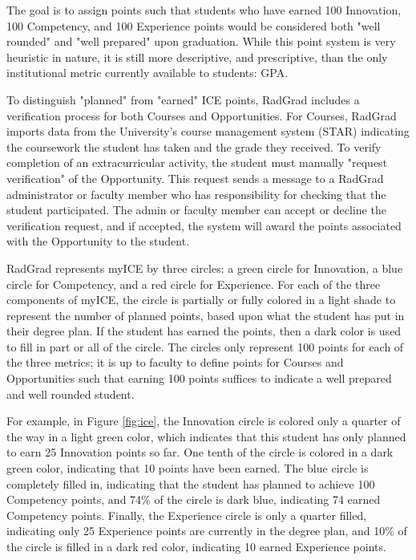 \documentclass[acmsmall,nonacm]{acmart}
\begin{document}
The goal is to assign points such that students who have earned 100 Innovation, 100 Competency, and 100 Experience points would be considered both "well rounded" and "well prepared" upon graduation.  While this point system is very heuristic in nature, it is still more descriptive, and prescriptive, than the only institutional metric currently available to students: GPA.

To distinguish "planned" from "earned" ICE points, RadGrad includes a verification process for both Courses and Opportunities. For Courses, RadGrad imports data from the University's course management system (STAR) indicating the coursework the student has taken and the grade they received.  To verify completion of an extracurricular activity, the student must manually "request verification" of the Opportunity.  This request sends a message to a RadGrad administrator or faculty member who has responsibility for checking that the student participated. The admin or faculty member can accept or decline the verification request, and if accepted, the system will award the points associated with the Opportunity to the student.

RadGrad represents myICE by three circles: a green circle for Innovation, a blue circle for Competency, and a red circle for Experience. For each of the three components of myICE, the circle is partially or fully colored in a light shade to represent the number of planned points, based upon what the student has put in their degree plan. If the student has earned the points, then a dark color is used to fill in part or all of the circle. The circles only represent 100 points for each of the three metrics; it is up to faculty to define points for Courses and Opportunities such that earning 100 points suffices to indicate a well prepared and well rounded student.

For example, in Figure \ref{fig:ice}, the Innovation circle is colored only a quarter of the way in a light green color, which indicates that this student has only planned to earn 25 Innovation points so far. One tenth of the circle is colored in a dark green color, indicating that 10 points have been earned. The blue circle is completely filled in, indicating that the student has planned to achieve 100 Competency points, and 74\% of the circle is dark blue, indicating 74 earned Competency points.  Finally, the Experience circle is only a quarter filled, indicating only 25 Experience points are currently in the degree plan, and 10\% of the circle is filled in a dark red color, indicating 10 earned Experience points.
\end{document}
